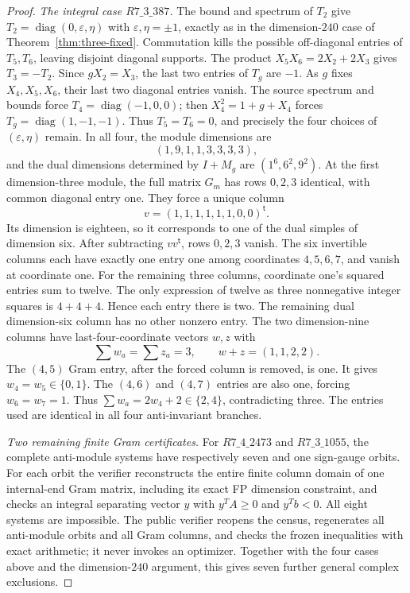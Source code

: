 \begin{proof}
\emph{The integral case $R7\_3\_387$.}
The bound and spectrum of $T_2$ give
$T_2=\operatorname{diag}(0,\varepsilon,\eta)$ with
$\varepsilon,\eta=\pm1$, exactly as in the dimension-$240$
case of Theorem~\ref{thm:three-fixed}. Commutation kills the possible
off-diagonal entries of $T_5,T_6$, leaving disjoint diagonal supports.
The product $X_5X_6=2X_2+2X_3$ gives $T_3=-T_2$.
Since $gX_2=X_3$, the last two entries of $T_g$ are $-1$.
As $g$ fixes $X_4,X_5,X_6$, their last two diagonal entries vanish.
The source spectrum and bounds force
$T_4=\operatorname{diag}(-1,0,0)$; then
$X_4^2=1+g+X_4$ forces $T_g=\operatorname{diag}(1,-1,-1)$.
Thus $T_5=T_6=0$, and precisely the four choices of
$(\varepsilon,\eta)$ remain. In all four, the module dimensions are
\[
 (1,9,1,1,3,3,3,3),
\]
and the dual dimensions determined by $I+M_g$ are
$(1^6,6^2,9^2)$. At the first dimension-three module, the full matrix
$G_m$ has rows $0,2,3$ identical, with common diagonal entry one.
They force a unique column
\[
 v=(1,1,1,1,1,1,0,0)^{\mathsf t}.
\]
Its dimension is eighteen, so it corresponds to one of the dual
simples of dimension six. After subtracting $vv^{\mathsf t}$, rows
$0,2,3$ vanish. The six invertible columns each have exactly one
entry one among coordinates $4,5,6,7$, and vanish at coordinate one.
For the remaining three columns, coordinate one's squared entries
sum to twelve. The only expression of twelve as three nonnegative
integer squares is $4+4+4$. Hence each entry there is two.
The remaining dual dimension-six column has no other nonzero entry.
The two dimension-nine columns have last-four-coordinate vectors
$w,z$ with
\[
 \sum w_a=\sum z_a=3,\qquad w+z=(1,1,2,2).
\]
The $(4,5)$ Gram entry, after the forced column is removed, is one.
It gives $w_4=w_5\in\{0,1\}$. The $(4,6)$ and $(4,7)$ entries
are also one, forcing $w_6=w_7=1$. Thus
$\sum w_a=2w_4+2\in\{2,4\}$, contradicting three. The entries used
are identical in all four anti-invariant branches.

\emph{Two remaining finite Gram certificates.}
For $R7\_4\_2473$ and $R7\_3\_1055$, the complete anti-module
systems have respectively seven and one sign-gauge orbits. For each
orbit the verifier reconstructs the entire finite column domain of
one internal-end Gram matrix, including its exact FP dimension
constraint, and checks an integral separating vector $y$ with
$y^TA\geq0$ and $y^Tb<0$. All eight systems are impossible.
The public verifier reopens the census, regenerates all anti-module
orbits and all Gram columns, and checks the frozen inequalities with
exact arithmetic; it never invokes an optimizer. Together with the
four cases above and the dimension-$240$ argument, this gives seven
further general complex exclusions.

\end{proof}
